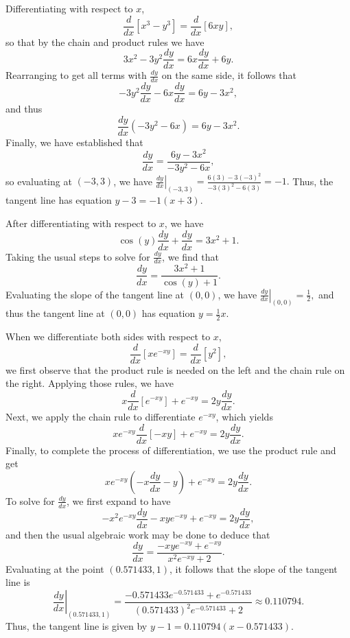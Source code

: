 \begin{activitySolution}
	\ba
		\item Differentiating with respect to $x$,
		$$\frac{d}{dx}[x^3 - y^3] = \frac{d}{dx}[6xy],$$
		so that by the chain and product rules we have
		$$3x^2 - 3y^2 \frac{dy}{dx} = 6x\frac{dy}{dx}+ 6y.$$
		Rearranging to get all terms with $\frac{dy}{dx}$ on the same side, it follows that
		$$-3y^2 \frac{dy}{dx} - 6x\frac{dy}{dx} = 6y-3x^2,$$
		and thus
		$$\frac{dy}{dx}(-3y^2 - 6x) = 6y-3x^2.$$
		Finally, we have established that 
		$$\frac{dy}{dx} = \frac{6y-3x^2}{-3y^2 - 6x},$$
		so evaluating at
		 $(-3,3)$, we have
		 $\left. \frac{dy}{dx} \right|_{(-3,3)} = \frac{6(3)-3(-3)^2}{-3(3)^2 - 6(3)} = -1.$
		 Thus, the tangent line has equation $y - 3 = -1(x+3).$
		\item After differentiating with respect to $x$, we have
		 $$\cos(y) \frac{dy}{dx} + \frac{dy}{dx} = 3x^2 + 1.$$
		 Taking the usual steps to solve for $\frac{dy}{dx}$, we find that
		 $$\frac{dy}{dx} = \frac{3x^2 + 1}{\cos(y) + 1}.$$
		 Evaluating the slope of the tangent line at
		 $(0,0)$, we have
		 $\left. \frac{dy}{dx} \right|_{(0,0)} = \frac{1}{2},$
		 and thus the tangent line at $(0,0)$ has equation $y = \frac{1}{2}x$.		
		\item When we differentiate both sides with respect to $x$, 
		$$\frac{d}{dx}[x e^{-xy}] = \frac{d}{dx}[y^2],$$
		we first observe that the product rule is needed on the left and the chain rule on the right.  Applying those rules, we have
		$$x\frac{d}{dx}[e^{-xy}] + e^{-xy} = 2y\frac{dy}{dx}.$$
		Next, we apply the chain rule to differentiate $e^{-xy}$, which yields
		$$xe^{-xy}\frac{d}{dx}[-xy] + e^{-xy} = 2y\frac{dy}{dx}.$$
		Finally, to complete the process of differentiation, we use the product rule and get
		$$xe^{-xy}(-x\frac{dy}{dx} - y) + e^{-xy} = 2y\frac{dy}{dx}.$$
		To solve for $\frac{dy}{dx}$, we first expand to have
		$$-x^2e^{-xy}\frac{dy}{dx} - xye^{-xy} + e^{-xy} = 2y\frac{dy}{dx},$$
		and then the usual algebraic work may be done to deduce that
		$$\frac{dy}{dx} = \frac{-xye^{-xy} + e^{-xy}}{x^2e^{-xy}+2}.$$
		Evaluating at the point
		$(0.571433,1)$, it follows that the slope of the tangent line is
		$$\left. \frac{dy}{dx} \right|_{(0.571433,1)} = \frac{-0.571433 e^{-0.571433} + e^{-0.571433}}{(0.571433)^2e^{-0.571433}+2} \approx 0.110794.$$
		Thus, the tangent line is given by $y - 1 = 0.110794(x - 0.571433)$. 
	\ea
\end{activitySolution}
\aftera